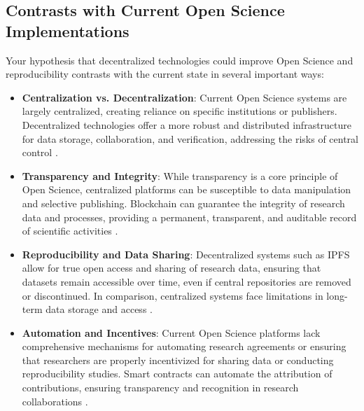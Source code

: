 \documentclass{article}
\begin{document}
\subsection{Contrasts with Current Open Science Implementations}
Your hypothesis that decentralized technologies could improve Open Science and reproducibility contrasts with the current state in several important ways:
\begin{itemize}
    \item \textbf{Centralization vs. Decentralization}: Current Open Science systems are largely centralized, creating reliance on specific institutions or publishers. Decentralized technologies offer a more robust and distributed infrastructure for data storage, collaboration, and verification, addressing the risks of central control \cite{Boulton2015}.
    \item \textbf{Transparency and Integrity}: While transparency is a core principle of Open Science, centralized platforms can be susceptible to data manipulation and selective publishing. Blockchain can guarantee the integrity of research data and processes, providing a permanent, transparent, and auditable record of scientific activities \cite{Borgman2012}.
    \item \textbf{Reproducibility and Data Sharing}: Decentralized systems such as IPFS allow for true open access and sharing of research data, ensuring that datasets remain accessible over time, even if central repositories are removed or discontinued. In comparison, centralized systems face limitations in long-term data storage and access \cite{Piwowar2011}.
    \item \textbf{Automation and Incentives}: Current Open Science platforms lack comprehensive mechanisms for automating research agreements or ensuring that researchers are properly incentivized for sharing data or conducting reproducibility studies. Smart contracts can automate the attribution of contributions, ensuring transparency and recognition in research collaborations \cite{Leonelli2016}.
\end{itemize}
\end{document}
